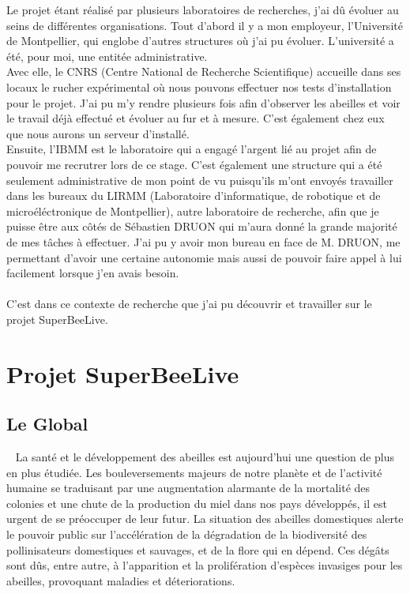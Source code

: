 \documentclass[11pt,french,a4paper]{report}
\begin{document}
Le projet étant réalisé par plusieurs laboratoires de recherches, j'ai dû évoluer au seins de différentes organisations. 
Tout d'abord il y a mon employeur, l'Université de Montpellier, qui englobe d'autres structures où j'ai pu évoluer. 
L'université a été, pour moi, une entitée administrative. \\ 
Avec elle, le CNRS (Centre National de Recherche Scientifique) accueille dans ses locaux le rucher expérimental où 
nous pouvons effectuer nos tests d'installation pour le projet. J'ai pu m'y rendre plusieurs fois afin d'observer les abeilles
et voir le travail déjà effectué et évoluer au fur et à mesure. C'est également chez eux que nous aurons un serveur d'installé.\\
Ensuite, l'IBMM est le laboratoire qui a engagé l'argent lié au projet afin de pouvoir me recrutrer lors de ce stage. 
C'est également une structure qui a été seulement administrative de mon point de vu puisqu'ils m'ont envoyés travailler dans 
les bureaux du LIRMM (Laboratoire d'informatique, de robotique et de microéléctronique de Montpellier), autre laboratoire de 
recherche, afin que je puisse être aux côtés de Sébastien DRUON qui m'aura donné la grande majorité de mes tâches à effectuer. 
J'ai pu y avoir mon bureau en face de M. DRUON, me permettant d'avoir une certaine autonomie mais aussi de pouvoir faire
appel à lui facilement lorsque j'en avais besoin.\\
\\
C'est dans ce contexte de recherche que j'ai pu découvrir et travailler sur le projet SuperBeeLive. \\ 


\section{Projet SuperBeeLive}
\subsection{Le Global} 
La santé et le développement des abeilles est aujourd’hui une question de plus en plus étudiée. Les bouleversements
majeurs de notre planète et de l’activité humaine se traduisant par une augmentation alarmante de la mortalité
des colonies et une chute de la production du miel dans nos pays développés, il est urgent de se préoccuper de leur futur. 
La situation des abeilles domestiques alerte le pouvoir public sur l’accélération de la dégradation de la biodiversité des 
pollinisateurs domestiques et sauvages, et de la flore qui en dépend. Ces dégâts sont dûs, entre autre, à l’apparition 
et la prolifération d’espèces invasiges pour les abeilles, provoquant maladies et déteriorations. 
\end{document}
